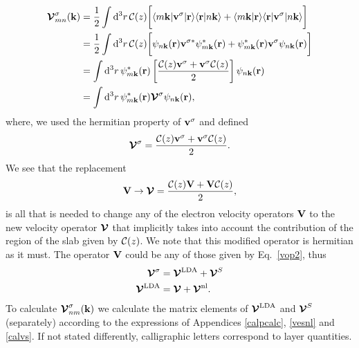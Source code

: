 \documentclass[floatfix,prb,aps,superscriptaddress,11pt,preprint,letterpaper]{revtex4}
\def\chon{black}
\begin{document}
\begin{align}\label{intj}
{\boldsymbol{\mathcal{V}}}^{\sigma}_{mn}({\mathbf k})
&=
\frac{1}{2}
\int \mathrm{d}^3 r\,
 {\mathbf{\cal C}}(z)
\bigg[
\langle m\mathbf{k}|\mathbf{v}^\sigma | \mathbf{r}\rangle
\langle \mathbf{r} | n \mathbf k \rangle +
\langle m\mathbf{k} | \mathbf{r}\rangle
\langle \mathbf{r} | \mathbf{v}^\sigma | n \mathbf k \rangle\bigg]
\nonumber\\
&=
\frac{1}{2}
\int \mathrm{d}^3 r\,
 {\mathbf{\cal C}}(z)
 \bigg[
\psi_{n\mathbf{k}}(\mathbf{r})
\mathbf{v}^{\sigma *}\psi^*_{m\mathbf{k}}(\mathbf{r})
+ 
\psi^*_{m\mathbf{k}}(\mathbf{r})\mathbf{v}^\sigma
\psi_{n\mathbf{k}}(\mathbf{r})
\bigg]
\nonumber\\
&=
\int \mathrm{d}^3 r\,
\psi^*_{m\mathbf{k}}(\mathbf{r})
\left[\frac{{\mathbf{\cal C}}(z) \mathbf{v}^\sigma +
\mathbf{v}^\sigma {\mathbf{\cal C}}(z)}{2}\right]
\psi_{n\mathbf{k}}(\mathbf{r})
\nonumber\\
&=
\int \mathrm{d}^3 r\,
\psi^*_{m\mathbf{k}}(\mathbf{r})
\boldsymbol{\mathcal{\cal V}}^{\sigma}
\psi_{n\mathbf{k}}(\mathbf{r})
,
\end{align}
where, we used the hermitian property of $\mathbf{v}^\sigma$ and defined
\begin{align}\label{nl.4}
\boldsymbol{\mathcal{\cal V}}^{\sigma}
=
\frac{{\mathbf{\cal C}}(z) \mathbf{v}^\sigma +
\mathbf{v}^\sigma {\mathbf{\cal C}}(z)}{2}
.
\end{align} 
We see that the replacement
\begin{align}\label{vcali}
\mathbf{V} \to \boldsymbol{\mathcal{\cal V}}=\frac{{\mathbf{\cal C}}(z) \mathbf{V} +
\mathbf{V} {\mathbf{\cal C}}(z)}{2}
,
\end{align} 
is all that is needed to change any of the
{\color{\chon} electron} velocity operators $\mathbf{V}$ to the new velocity
operator $\boldsymbol{\mathcal{\cal V}}$ that implicitly takes into account the
contribution of the region of the slab given by ${\mathbf{\cal C}}(z)$.
We note that this modified operator is hermitian as it must.\cite{nota3}
The operator $\mathbf{V}$ could be any of those given by Eq.~\eqref{vop2},
thus
\begin{align}\label{vopii}
\boldsymbol{\mathcal{\cal V}}^{\sigma}
&=
\boldsymbol{\mathcal{\cal V}}^{\mathrm{LDA}}
+
\boldsymbol{\mathcal{\cal V}}^{S}
\nonumber\\
\boldsymbol{\mathcal{\cal V}}^{\mathrm{LDA}}
&=
\boldsymbol{\mathcal{\cal V}}
+
\boldsymbol{\mathcal{\cal V}}^{\mathrm{nl}}
.
\end{align}
To calculate
$\boldsymbol{\mathcal{\cal V}}^{\sigma}_{nm}(\mathbf{k})$ 
we calculate the matrix elements of 
$\boldsymbol{\mathcal{\cal V}}^{\mathrm{LDA}}$ and $\boldsymbol{\mathcal{\cal V}}^{S}$
 (separately)
according to the expressions of
Appendices \ref{calpcalc}, \ref{vesnl} and \ref{calvs}.
If not stated differently, calligraphic letters correspond to layer quantities. 
\end{document}
